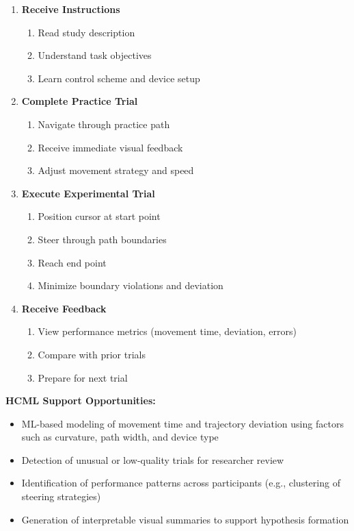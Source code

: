 \documentclass[sigconf]{acmart}
\begin{document}
\begin{enumerate}
  \item \textbf{Receive Instructions}
    \begin{enumerate}
      \item Read study description
      \item Understand task objectives
      \item Learn control scheme and device setup
    \end{enumerate}
  
  \item \textbf{Complete Practice Trial}
    \begin{enumerate}
      \item Navigate through practice path
      \item Receive immediate visual feedback
      \item Adjust movement strategy and speed
    \end{enumerate}
  
  \item \textbf{Execute Experimental Trial}
    \begin{enumerate}
      \item Position cursor at start point
      \item Steer through path boundaries
      \item Reach end point
      \item Minimize boundary violations and deviation
    \end{enumerate}
  
  \item \textbf{Receive Feedback}
    \begin{enumerate}
      \item View performance metrics (movement time, deviation, errors)
      \item Compare with prior trials
      \item Prepare for next trial
    \end{enumerate}
\end{enumerate}

\textbf{HCML Support Opportunities:}
\begin{itemize}
  \item ML-based modeling of movement time and trajectory deviation
        using factors such as curvature, path width, and device type
  \item Detection of unusual or low-quality trials for researcher review
  \item Identification of performance patterns across participants
        (e.g., clustering of steering strategies)
  \item Generation of interpretable visual summaries to support
        hypothesis formation
\end{itemize}
\end{document}
